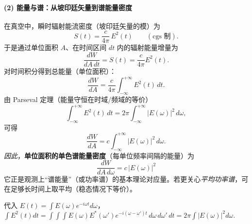 \paragraph{(2) 能量与谱：从坡印廷矢量到\;谱能量密度}
在真空中，瞬时辐射能流密度（坡印廷矢量的模）为
\begin{equation}
  S(t)=\frac{c}{4\pi}\,E^2(t)\qquad(\text{cgs 制}).
\end{equation}
于是通过单位面积 $A$、在时间区间 $dt$ 内的辐射能量增量为
\begin{equation}
  \frac{dW}{dA\,dt}=S(t)=\frac{c}{4\pi}E^2(t).
\end{equation}
对时间积分得到总能量（单位面积）：
\begin{equation}
  \frac{dW}{dA}=\frac{c}{4\pi}\int_{-\infty}^{+\infty} E^2(t)\,dt .
\end{equation}
由 Parseval 定理（能量守恒在时域/频域的等价）
\begin{equation}
  \int_{-\infty}^{+\infty}E^2(t)\,dt
  = 2\pi\int_{-\infty}^{+\infty}\!\!\! |E(\omega)|^2\,d\omega ,
\end{equation}
可得
\begin{equation}
  \frac{dW}{dA} = c \int_{-\infty}^{+\infty} |E(\omega)|^2\,d\omega .
\end{equation}
\emph{因此}，\textbf{单位面积的单色谱能量密度}（每单位频率间隔的能量）为
\begin{equation}
  \boxed{\;\frac{dW}{dA\,d\omega}=c\,|E(\omega)|^2\;}
\end{equation}
它正是观测上“谱能量”（或功率谱）的基本理论对应量。若更关心\emph{平均功率谱}，可在足够长时间上取平均（稳态情况下等价）。

\begin{derivationnote}
代入 $E(t)=\int E(\omega)e^{-i\omega t}d\omega$，
\(
\int E^2(t)dt=\int\!\!\int\!\!\int
E(\omega)E^*(\omega')e^{-i(\omega-\omega')t}\,d\omega\,d\omega'\,dt
=2\pi\int |E(\omega)|^2 d\omega .
\)
\end{derivationnote}

